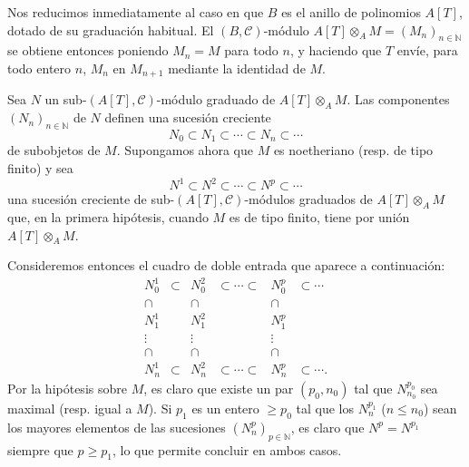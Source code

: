 \begin{prooftext}
Nos reducimos inmediatamente al caso en que \(B\) es el anillo de polinomios \(A[T]\), dotado de su graduación habitual. El \((B,\mathcal C)\)-módulo \(A[T]\otimes_A M=(M_n)_{n\in\mathbb N}\) se obtiene entonces poniendo \(M_n=M\) para todo \(n\), y haciendo que \(T\) envíe, para todo entero \(n\), \(M_n\) en \(M_{n+1}\) mediante la identidad de \(M\).

Sea \(N\) un sub-\((A[T],\mathcal C)\)-módulo graduado de \(A[T]\otimes_A M\). Las componentes \((N_n)_{n\in\mathbb N}\) de \(N\) definen una sucesión creciente
\[
N_0\subset N_1\subset\cdots\subset N_n\subset\cdots
\]
de subobjetos de \(M\). Supongamos ahora que \(M\) es noetheriano (resp. de tipo finito) y sea
\[
N^1\subset N^2\subset\cdots\subset N^p\subset\cdots
\]
una sucesión creciente de sub-\((A[T],\mathcal C)\)-módulos graduados de \(A[T]\otimes_A M\) que, en la primera hipótesis, cuando \(M\) es de tipo finito, tiene por unión \(A[T]\otimes_A M\).

Consideremos entonces el cuadro de doble entrada que aparece a continuación:
\[
\begin{array}{cccccc}
N_0^1&\subset&N_0^2&\subset\cdots\subset&N_0^p&\subset\cdots\\
\cap&&\cap&&\cap\\
N_1^1&&N_1^2&&N_1^p\\
\vdots&&\vdots&&\vdots\\
\cap&&\cap&&\cap\\
N_n^1&\subset&N_n^2&\subset\cdots\subset&N_n^p&\subset\cdots .
\end{array}
\]
Por la hipótesis sobre \(M\), es claro que existe un par \((p_0,n_0)\) tal que \(N^{p_0}_{n_0}\) sea maximal (resp. igual a \(M\)). Si \(p_1\) es un entero \(\ge p_0\) tal que los \(N_n^{p_1}\) (\(n\le n_0\)) sean los mayores elementos de las sucesiones \((N_n^p)_{p\in\mathbb N}\), es claro que \(N^p=N^{p_1}\) siempre que \(p\ge p_1\), lo que permite concluir en ambos casos.
\end{prooftext}
